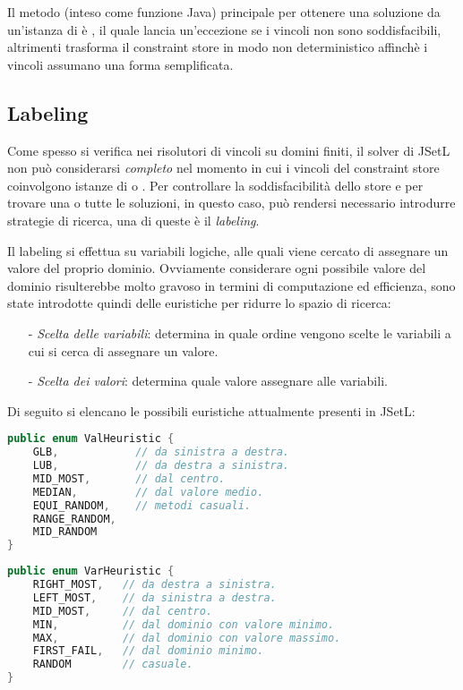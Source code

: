 Il metodo (inteso come funzione Java) principale per ottenere una soluzione
da un'istanza  di  è , il quale
lancia un'eccezione se i vincoli non sono soddisfacibili, altrimenti trasforma
il constraint store in modo non deterministico affinchè i vincoli
assumano una  forma semplificata.

\subsection{Labeling}
Come spesso si verifica nei risolutori di vincoli su domini finiti, il
solver di JSetL non può considerarsi \emph{completo} nel momento in cui i
vincoli del constraint store coinvolgono istanze di  o
. Per controllare la soddisfacibilità dello store e per
trovare una o tutte le soluzioni, in questo caso, può rendersi
necessario introdurre strategie di ricerca, una di queste è il
\emph{labeling}.

Il labeling si effettua su variabili logiche, alle quali viene cercato di
assegnare un valore del proprio dominio.
Ovviamente considerare ogni possibile valore del dominio risulterebbe molto
gravoso in termini di computazione ed efficienza, sono state introdotte quindi
delle euristiche per ridurre lo spazio di ricerca:
\begin{itemize}
\item[-]\emph{Scelta delle variabili}: determina in quale ordine vengono 
scelte le variabili a cui si cerca di assegnare un valore.
\item[-]\emph{Scelta dei valori}: determina quale valore assegnare alle 
variabili.
\end{itemize}

Di seguito si elencano le possibili euristiche attualmente presenti in JSetL:
\begin{lstlisting}[language = Java,
                   caption = {euristiche dei valori.}]
public enum ValHeuristic {
	GLB,            // da sinistra a destra.
	LUB,            // da destra a sinistra.
	MID_MOST,       // dal centro.
	MEDIAN,         // dal valore medio.
	EQUI_RANDOM,    // metodi casuali.
	RANGE_RANDOM,
	MID_RANDOM
}
\end{lstlisting}
\begin{lstlisting}[language = Java,
                   caption = {euristiche delle variabili.}]
public enum VarHeuristic {
	RIGHT_MOST,   // da destra a sinistra.
	LEFT_MOST,    // da sinistra a destra.
	MID_MOST,     // dal centro.
	MIN,          // dal dominio con valore minimo.
	MAX,          // dal dominio con valore massimo.
	FIRST_FAIL,   // dal dominio minimo.
	RANDOM        // casuale.
}
\end{lstlisting}

